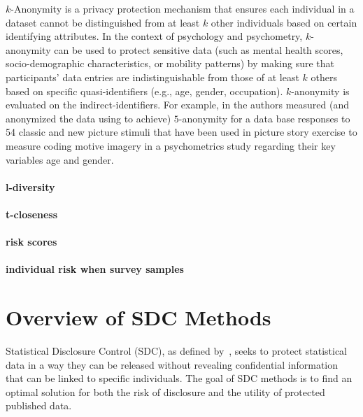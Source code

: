 \documentclass{article}
\begin{document}
\color{blue}
$k$-Anonymity is a privacy protection mechanism that ensures each individual in a dataset cannot be distinguished from at least $k$  other individuals based on certain identifying attributes. In the context of psychology and psychometry, $k$-anonymity can be used to protect sensitive data (such as mental health scores, socio-demographic characteristics, or mobility patterns) by making sure that participants’ data entries are indistinguishable from those of at least $k$  others based on specific quasi-identifiers (e.g., age, gender, occupation).  $k$-anonymity is evaluated on the indirect-identifiers. For example, in \citep{schoenbrodt21} the authors measured (and anonymized the data using \cite{2024_Sdcmicro} to achieve) $5$-anonymity for a data base responses to 54 classic and new picture stimuli that have
been used in picture story exercise to measure coding motive imagery in a psychometrics study regarding their key variables age and gender.
\color{black}

\paragraph{l-diversity}

\paragraph{t-closeness}

\paragraph{risk scores}

\paragraph{individual risk when survey samples}

\section{Overview of SDC Methods}

Statistical Disclosure Control (SDC), as defined by~\cite{2012_Hundepool}, seeks to protect statistical data in a way they can be released without revealing confidential information that can be linked to specific individuals. The goal of SDC methods is to find an optimal solution for both the risk of disclosure and the utility of protected published data.
\end{document}

